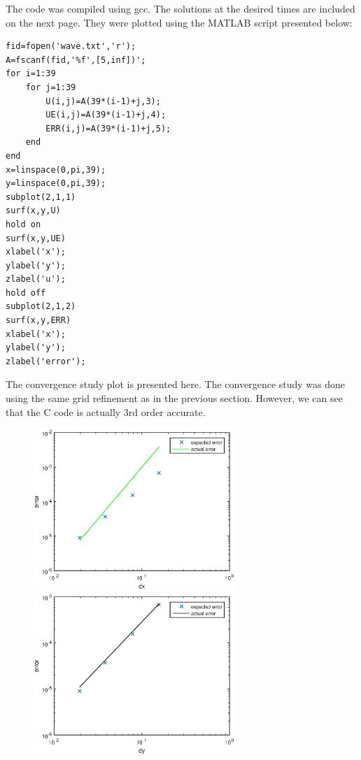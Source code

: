 The code was compiled using gcc. The solutions at the desired times are included on the next page. They were plotted using the MATLAB script presented below:
\begin{lstlisting}
fid=fopen('wave.txt','r');
A=fscanf(fid,'%f',[5,inf])';
for i=1:39
    for j=1:39
        U(i,j)=A(39*(i-1)+j,3);
        UE(i,j)=A(39*(i-1)+j,4);
        ERR(i,j)=A(39*(i-1)+j,5);
    end
end
x=linspace(0,pi,39);
y=linspace(0,pi,39);
subplot(2,1,1)
surf(x,y,U)
hold on
surf(x,y,UE)
xlabel('x');
ylabel('y');
zlabel('u');
hold off
subplot(2,1,2)
surf(x,y,ERR)
xlabel('x');
ylabel('y');
zlabel('error');
\end{lstlisting}

The convergence study plot is presented here. The convergence study was done using the same grid refinement as in the previous section. However, we can see that the C code is actually 3rd order accurate.
\begin{figure}[ht]
\centering
\includegraphics[width=3in]{cconvstdx}
\includegraphics[width=3in]{cconvstdy}
\end{figure}
